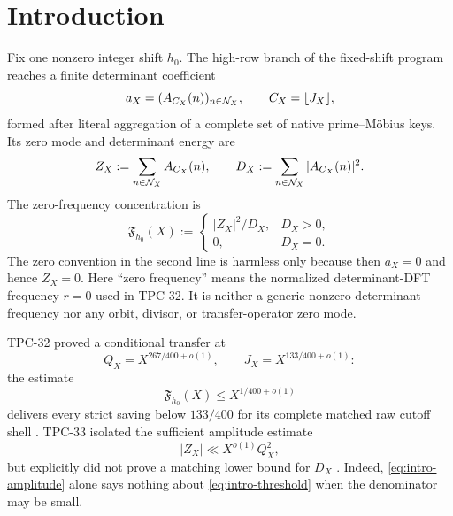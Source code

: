 \section{Introduction}
\label{sec:introduction}

Fix one nonzero integer shift \(h_0\).  The high-row branch of the
fixed-shift program reaches a finite determinant coefficient
\begin{equation}
 a_X=(A_{C_X}(n))_{n\in\mathcal N_X},
 \qquad C_X=\lfloor J_X\rfloor,
 \label{eq:intro-coefficient}
\end{equation}
formed after literal aggregation of a complete set of native
prime--M\"obius keys.  Its zero mode and determinant energy are
\begin{equation}
 Z_X:=\sum_{n\in\mathcal N_X}A_{C_X}(n),
 \qquad
 D_X:=\sum_{n\in\mathcal N_X}|A_{C_X}(n)|^2.
 \label{eq:intro-ZD}
\end{equation}
The zero-frequency concentration is
\begin{equation}
 \mathfrak F_{h_0}(X)
 :=
 \begin{cases}
 |Z_X|^2/D_X,&D_X>0,\\
 0,&D_X=0.
 \end{cases}
 \label{eq:intro-flatness}
\end{equation}
The zero convention in the second line is harmless only because then
\(a_X=0\) and hence \(Z_X=0\).
Here ``zero frequency'' means the normalized determinant-DFT
frequency \(r=0\) used in TPC-32.  It is neither a generic nonzero
determinant frequency nor any orbit, divisor, or transfer-operator
zero mode.

TPC-32 proved a conditional transfer at
\begin{equation}
 Q_X=X^{267/400+o(1)},
 \qquad
 J_X=X^{133/400+o(1)}:
 \label{eq:intro-scales}
\end{equation}
the estimate
\begin{equation}
 \mathfrak F_{h_0}(X)\le X^{1/400+o(1)}
 \label{eq:intro-threshold}
\end{equation}
delivers every strict saving below \(133/400\) for its complete
matched raw cutoff shell \citep{WangTPC32}.  TPC-33 isolated the
sufficient amplitude estimate
\begin{equation}
 |Z_X|\ll X^{o(1)}Q_X^2,
 \label{eq:intro-amplitude}
\end{equation}
but explicitly did not prove a matching lower bound for \(D_X\)
\citep{WangTPC33}.  Indeed, \eqref{eq:intro-amplitude} alone says
nothing about \eqref{eq:intro-threshold} when the denominator may be
small.

